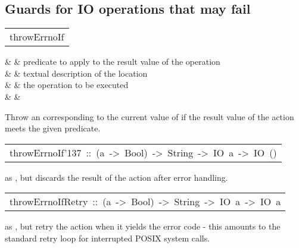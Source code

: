 \subsection{Guards for IO operations that may fail
}
\begin{haddockdesc}
\item[\begin{tabular}{@{}l}
throwErrnoIf
\end{tabular}]\haddockbegindoc
\haddockbeginargs
\haddockdecltt{::} &  & predicate to apply to the result value
 of the  operation
 \\
                                                 \haddockdecltt{->} &  & textual description of the location
 \\
                                                                                               \haddockdecltt{->} &  & the  operation to be executed
 \\
                                                                                                                                           \haddockdecltt{->} &  & \\
\haddockendargs\par
Throw an  corresponding to the current value of 
 if the result value of the  action meets the given predicate.
\par

\end{haddockdesc}
\begin{haddockdesc}
\item[\begin{tabular}{@{}l}
throwErrnoIf{\char '137}\ ::\ (a\ ->\ Bool)\ ->\ String\ ->\ IO\ a\ ->\ IO\ ()
\end{tabular}]\haddockbegindoc
as , but discards the result of the  action after
 error handling.
\par

\end{haddockdesc}
\begin{haddockdesc}
\item[\begin{tabular}{@{}l}
throwErrnoIfRetry\ ::\ (a\ ->\ Bool)\ ->\ String\ ->\ IO\ a\ ->\ IO\ a
\end{tabular}]\haddockbegindoc
as , but retry the  action when it yields the
 error code  - this amounts to the standard retry loop for
 interrupted POSIX system calls.
\par

\end{haddockdesc}
